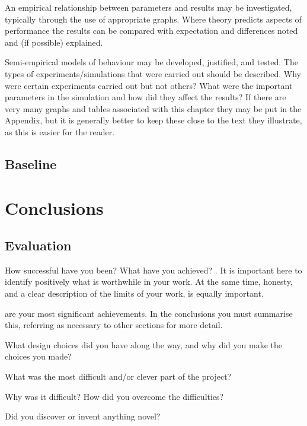\documentclass[10pt,onecolumn,letterpaper]{article}
\begin{document}
An empirical relationship between parameters and results may be investigated, typically through the use of appropriate graphs.
Where theory predicts aspects of performance the results can be compared with expectation and differences noted and (if
possible) explained.

Semi-empirical models of behaviour may be developed, justified, and tested. The types of experiments/simulations that were carried out should be described. Why were certain experiments carried out but not others? What were the important parameters in the simulation and how did they affect the results? If there are very many graphs and tables associated with this chapter they may be put in the Appendix, but it is generally better to keep these close to the text they illustrate, as this is easier for the reader.
\fi

\subsection{Baseline}

\newpage


\newpage

\section{Conclusions}

\subsection{Evaluation}
\iffalse

How successful have you been? What have you achieved? . It is important here to identify positively what is worthwhile in your work. At the same time, honesty, and a clear description of the limits of your work, is equally important.

are your most significant achievements. In the conclusions you must summarise this, referring as necessary to other sections for more detail.

What design choices did you have along the way, and why did you make the choices you made?

What was the most difficult and/or clever part of the project?

Why was it difficult? How did you overcome the difficulties?

Did you discover or invent anything novel?
\end{document}
